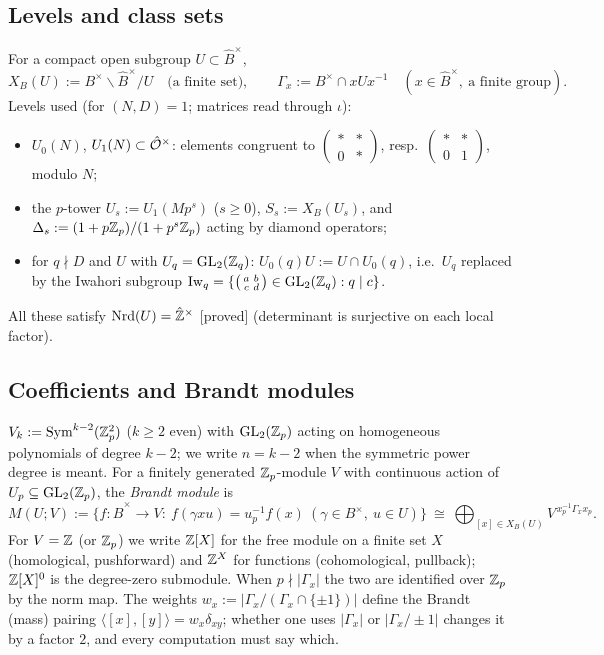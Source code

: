 \documentclass[11pt]{amsart}
\theoremstyle{plain}
\theoremstyle{definition}
\theoremstyle{remark}
\newcommand{\status}[1]{\textup{\textsf{[#1]}}}
\newcommand{\stproved}{\status{proved}}
\newcommand{\GL}{\mathrm{GL}}\newcommand{\SL}{\mathrm{SL}}\newcommand{\PGL}{\mathrm{PGL}}
\newcommand{\Nrd}{\mathrm{Nrd}}\newcommand{\Sym}{\mathrm{Sym}}
\begin{document}
\subsection{Levels and class sets}
For a compact open subgroup $U\subset\hat B^\times$,
\[X_B(U):=B^\times\backslash\hat B^\times/U\quad\text{(a finite set)},\qquad \Gamma_x:=B^\times\cap xUx^{-1}\quad(x\in\hat B^\times,\ \text{a finite group}).\]
Levels used (for $(N,D)=1$; matrices read through $\iota$):
\begin{itemize}
\item $U_0(N)$, $U_1(N)\subset\hat{\mathcal{O}}^\times$: elements congruent to $\left(\begin{smallmatrix}*&*\\0&*\end{smallmatrix}\right)$, resp.\ $\left(\begin{smallmatrix}*&*\\0&1\end{smallmatrix}\right)$, modulo $N$;
\item the $p$-tower $U_s:=U_1(Mp^s)$ ($s\ge0$), $S_s:=X_B(U_s)$, and $\Delta_s:=(1+p\mathbb{Z}_p)/(1+p^s\mathbb{Z}_p)$ acting by diamond operators;
\item for $q\nmid D$ and $U$ with $U_q=\GL_2(\Z_q)$: $U_0(q)U:=U\cap U_0(q)$, i.e.\ $U_q$ replaced by the Iwahori subgroup $\Iw_q=\{\left(\begin{smallmatrix}a&b\\c&d\end{smallmatrix}\right)\in\GL_2(\Z_q):q\mid c\}$.
\end{itemize}
All these satisfy $\Nrd(U)=\hat\Z^\times$ \stproved{} (determinant is surjective on each local factor).

\subsection{Coefficients and Brandt modules}
$V_k:=\Sym^{k-2}(\Z_p^2)$ ($k\ge2$ even) with $\GL_2(\Z_p)$ acting on homogeneous polynomials of degree $k-2$; we write $n=k-2$ when the symmetric power degree is meant.
For a finitely generated $\mathbb{Z}_p$-module $V$ with continuous action of $U_p\subseteq\GL_2(\Z_p)$, the \emph{Brandt module} is
\[M(U;V):=\{f:\hat B^\times\to V:\ f(\gamma xu)=u_p^{-1}f(x)\ (\gamma\in B^\times,\ u\in U)\}\ \cong\ \bigoplus_{[x]\in X_B(U)}V^{\,x_p^{-1}\Gamma_xx_p}.\]
For $V=\mathbb{Z}$ (or $\mathbb{Z}_p$) we write $\mathbb{Z}[X]$ for the free module on a finite set $X$ (homological, pushforward) and $\mathbb{Z}^X$ for functions (cohomological, pullback); $\mathbb{Z}[X]^0$ is the degree-zero submodule.
When $p\nmid|\Gamma_x|$ the two are identified over $\mathbb{Z}_p$ by the norm map.
The weights $w_x:=|\Gamma_x/(\Gamma_x\cap\{\pm1\})|$ define the Brandt (mass) pairing $\langle[x],[y]\rangle=w_x\delta_{xy}$; whether one uses $|\Gamma_x|$ or $|\Gamma_x/\pm1|$ changes it by a factor $2$, and every computation must say which.
\end{document}
